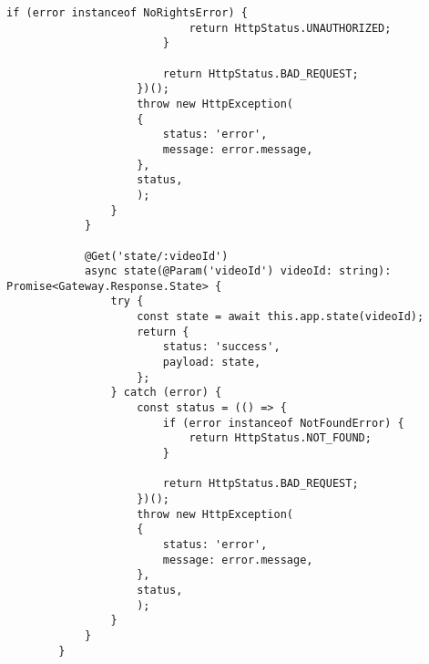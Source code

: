 \begin{lstlisting}[caption={app.controller.ts}]
	 					if (error instanceof NoRightsError) {
	 						return HttpStatus.UNAUTHORIZED;
	 					}
	 					
	 					return HttpStatus.BAD_REQUEST;
	 				})();
	 				throw new HttpException(
	 				{
	 					status: 'error',
	 					message: error.message,
	 				},
	 				status,
	 				);
	 			}
	 		}
	 		
	 		@Get('state/:videoId')
	 		async state(@Param('videoId') videoId: string): Promise<Gateway.Response.State> {
	 			try {
	 				const state = await this.app.state(videoId);
	 				return {
	 					status: 'success',
	 					payload: state,
	 				};
	 			} catch (error) {
	 				const status = (() => {
	 					if (error instanceof NotFoundError) {
	 						return HttpStatus.NOT_FOUND;
	 					}
	 					
	 					return HttpStatus.BAD_REQUEST;
	 				})();
	 				throw new HttpException(
	 				{
	 					status: 'error',
	 					message: error.message,
	 				},
	 				status,
	 				);
	 			}
	 		}
	 	}
	 \end{lstlisting}
	 

